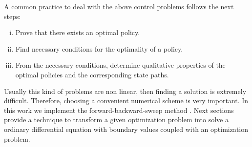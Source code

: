   A common practice to deal with the above control problems follows the next steps:
  \begin{enumerate}[(i)]
    \item
      Prove that there exists an optimal policy.
    \item 
      Find  necessary conditions for the optimality of a policy.
      
    \item 
      From the necessary conditions, determine qualitative properties of the
      optimal policies and the corresponding state paths.
     
  \end{enumerate}

 Usually this kind of problems are non linear, then finding a solution is 
      extremely difficult. Therefore, choosing a convenient numerical scheme is
      very important. In this work we implement the forward-backward-sweep 
      method \cite{lenhart2007optimal}. Next sections provide a technique to transform a given optimization
      problem into solve a ordinary differential equation with boundary values coupled with an optimization problem.